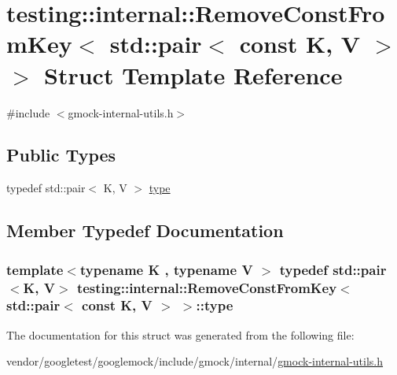 \hypertarget{structtesting_1_1internal_1_1RemoveConstFromKey_3_01std_1_1pair_3_01const_01K_00_01V_01_4_01_4}{}\section{testing\+:\+:internal\+:\+:Remove\+Const\+From\+Key$<$ std\+:\+:pair$<$ const K, V $>$ $>$ Struct Template Reference}
\label{structtesting_1_1internal_1_1RemoveConstFromKey_3_01std_1_1pair_3_01const_01K_00_01V_01_4_01_4}


{\ttfamily \#include $<$gmock-\/internal-\/utils.\+h$>$}

\subsection*{Public Types}
\begin{DoxyCompactItemize}
\item 
typedef std\+::pair$<$ K, V $>$ \hyperlink{structtesting_1_1internal_1_1RemoveConstFromKey_3_01std_1_1pair_3_01const_01K_00_01V_01_4_01_4_ac1d76274964aa8172889a4714246e86f}{type}
\end{DoxyCompactItemize}


\subsection{Member Typedef Documentation}
\subsubsection[{\texorpdfstring{type}{type}}]{\setlength{\rightskip}{0pt plus 5cm}template$<$typename K , typename V $>$ typedef std\+::pair$<$K, V$>$ {\bf testing\+::internal\+::\+Remove\+Const\+From\+Key}$<$ std\+::pair$<$ const K, V $>$ $>$\+::{\bf type}}\hypertarget{structtesting_1_1internal_1_1RemoveConstFromKey_3_01std_1_1pair_3_01const_01K_00_01V_01_4_01_4_ac1d76274964aa8172889a4714246e86f}{}\label{structtesting_1_1internal_1_1RemoveConstFromKey_3_01std_1_1pair_3_01const_01K_00_01V_01_4_01_4_ac1d76274964aa8172889a4714246e86f}


The documentation for this struct was generated from the following file\+:\begin{DoxyCompactItemize}
\item 
vendor/googletest/googlemock/include/gmock/internal/\hyperlink{gmock-internal-utils_8h}{gmock-\/internal-\/utils.\+h}\end{DoxyCompactItemize}
